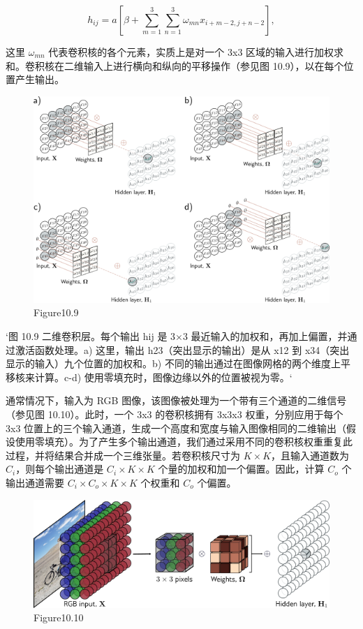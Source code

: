\[
h_{ij} = a \left[ \beta + \sum_{m=1}^{3} \sum_{n=1}^{3} \omega_{mn} x_{i+m-2,j+n-2} \right], \tag{10.6}
\]

这里 \(\omega_{mn}\) 代表卷积核的各个元素，实质上是对一个 3x3 区域的输入进行加权求和。卷积核在二维输入上进行横向和纵向的平移操作（参见图 10.9），以在每个位置产生输出。

\begin{figure}[h!]
\centering
\includegraphics[width=0.7\linewidth]{png/chapter10/Conv2D.png}
\caption{Figure10.9}
\end{figure}

`图 10.9 二维卷积层。每个输出 hij 是 3×3 最近输入的加权和，再加上偏置，并通过激活函数处理。a) 这里，输出 h23（突出显示的输出）是从 x12 到 x34（突出显示的输入）九个位置的加权和。b) 不同的输出通过在图像网格的两个维度上平移核来计算。c-d) 使用零填充时，图像边缘以外的位置被视为零。`

通常情况下，输入为 RGB 图像，该图像被处理为一个带有三个通道的二维信号（参见图 10.10）。此时，一个 3x3 的卷积核拥有 3x3x3 权重，分别应用于每个 3x3 位置上的三个输入通道，生成一个高度和宽度与输入图像相同的二维输出（假设使用零填充）。为了产生多个输出通道，我们通过采用不同的卷积核权重重复此过程，并将结果合并成一个三维张量。若卷积核尺寸为 \(K \times K\)，且输入通道数为 \(C_i\)，则每个输出通道是 \(C_i \times K \times K\) 个量的加权和加一个偏置。因此，计算 \(C_o\) 个输出通道需要 \(C_i \times C_o \times K \times K\) 个权重和 \(C_o\) 个偏置。


\begin{figure}[h!]
\centering
\includegraphics[width=0.7\linewidth]{png/chapter10/ConvImage.png}
\caption{Figure10.10}
\end{figure}

